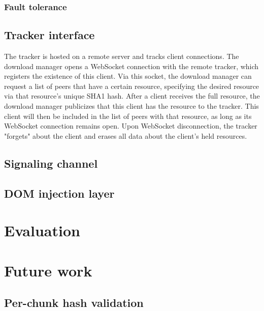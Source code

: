 \documentclass[letterpaper,twocolumn,10pt]{article}
\begin{document}
\subsubsection{Fault tolerance}


\subsection{Tracker interface}

The tracker is hosted on a remote server and tracks client connections. The download manager opens a WebSocket connection with the remote tracker, which registers the existence of this client. Via this socket, the download manager can request a list of peers that have a certain resource, specifying the desired resource via that resource's unique SHA1 hash. After a client receives the full resource, the download manager publicizes that this client has the resource to the tracker. This client will then be included in the list of peers with that resource, as long as its WebSocket connection remains open. Upon WebSocket disconnection, the tracker "forgets" about the client and erases all data about the client's held resources.

\subsection{Signaling channel}


\subsection{DOM injection layer}


\section{Evaluation}


\section{Future work}

\subsection{Per-chunk hash validation}

\end{document}
